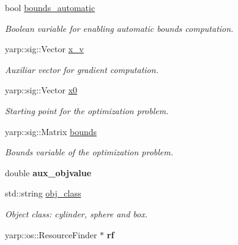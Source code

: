 \begin{DoxyCompactItemize}
\item 
\mbox{\label{classSuperQuadric__NLP_ac4ae54a0a2bc47b2a984278a4e57400c}} 
bool \mbox{\hyperlink{classSuperQuadric__NLP_ac4ae54a0a2bc47b2a984278a4e57400c}{bounds\+\_\+automatic}}
\begin{DoxyCompactList}\small\item\em Boolean variable for enabling automatic bounds computation. \end{DoxyCompactList}\item 
\mbox{\label{classSuperQuadric__NLP_a4215586669b4e4e835993634290cac9a}} 
yarp\+::sig\+::\+Vector \mbox{\hyperlink{classSuperQuadric__NLP_a4215586669b4e4e835993634290cac9a}{x\+\_\+v}}
\begin{DoxyCompactList}\small\item\em Auxiliar vector for gradient computation. \end{DoxyCompactList}\item 
\mbox{\label{classSuperQuadric__NLP_a25e5121f404d68a8fa0122e803945f8b}} 
yarp\+::sig\+::\+Vector \mbox{\hyperlink{classSuperQuadric__NLP_a25e5121f404d68a8fa0122e803945f8b}{x0}}
\begin{DoxyCompactList}\small\item\em Starting point for the optimization problem. \end{DoxyCompactList}\item 
\mbox{\label{classSuperQuadric__NLP_a3300e78dabc6dc8fd7e959c176b8a32c}} 
yarp\+::sig\+::\+Matrix \mbox{\hyperlink{classSuperQuadric__NLP_a3300e78dabc6dc8fd7e959c176b8a32c}{bounds}}
\begin{DoxyCompactList}\small\item\em Bounds variable of the optimization problem. \end{DoxyCompactList}\item 
\mbox{\label{classSuperQuadric__NLP_ad0bf24004b855864ad0a498f9fb13c81}} 
double {\bfseries aux\+\_\+objvalue}
\item 
\mbox{\label{classSuperQuadric__NLP_a6806ddd4f4b035abbf7835e4b38931ca}} 
std\+::string \mbox{\hyperlink{classSuperQuadric__NLP_a6806ddd4f4b035abbf7835e4b38931ca}{obj\+\_\+class}}
\begin{DoxyCompactList}\small\item\em Object class\+: cylinder, sphere and box. \end{DoxyCompactList}\item 
\mbox{\label{classSuperQuadric__NLP_a7dc22430259697726ab6341fc2e95074}} 
yarp\+::os\+::\+Resource\+Finder $\ast$ {\bfseries rf}
\end{DoxyCompactItemize}


